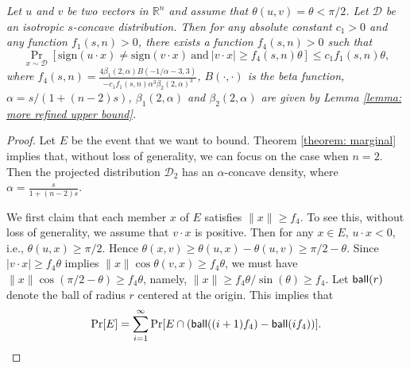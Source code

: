 \documentclass[11pt]{article}
\newcommand{\R}{\mathbb{R}}
\newcommand{\ball}{\textup{\textsf{ball}}}
\begin{document}
{{{{
\emph{Let $u$ and $v$ be two vectors in $\R^n$ and assume that $\theta(u,v)=\theta<\pi/2$. Let $\mathcal{D}$ be an isotropic $s$-concave distribution. Then for any absolute constant $c_1>0$ and any function $f_1(s,n)>0$, there exists a function $f_4(s,n)>0$ such that
\begin{equation*}
\Pr_{x\sim\mathcal{D}}[\mathrm{sign}(u\cdot x)\not=\mathrm{sign}(v\cdot x)\ \text{and}\ |v\cdot x|\ge f_4(s,n)\theta]\le c_1f_1(s,n)\theta,
\end{equation*}
where $f_4(s,n)=\frac{4\beta_1(2,\alpha)B(-1/\alpha-3,3)}{-c_1f_1(s,n)\alpha^3\beta_2(2,\alpha)^3}$, $B(\cdot,\cdot)$ is the beta function, $\alpha=s/(1+(n-2)s)$, $\beta_1(2,\alpha)$ and $\beta_2(2,\alpha)$ are given by Lemma \ref{lemma: more refined upper bound}.}

\medskip
\begin{proof}
Let $E$ be the event that we want to bound. Theorem \ref{theorem: marginal} implies that, without loss of generality, we can focus on the case when $n=2$. Then the projected distribution $\mathcal{D}_2$ has an $\alpha$-concave density, where $\alpha=\frac{s}{1+(n-2)s}$.

We first claim that each member $x$ of $E$ satisfies $\|x\|\ge f_4$. To see this, without loss of generality, we assume that $v\cdot x$ is positive. Then for any $x\in E$, $u\cdot x<0$, i.e., $\theta(u,x)\ge \pi/2$. Hence $\theta(x,v)\ge \theta(u,x)-\theta(u,v)\ge \pi/2-\theta$. Since $|v\cdot x|\ge f_4\theta$ implies $\|x\|\cos\theta(v,x)\ge f_4\theta$, we must have $\|x\|\cos(\pi/2-\theta)\ge f_4\theta$, namely, $\|x\|\ge f_4\theta/\sin(\theta)\ge f_4$. Let $\ball(r)$ denote the ball of radius $r$ centered at the origin. This implies that
\begin{equation*}
\Pr[E]=\sum_{i=1}^\infty \Pr[E\cap (\ball((i+1)f_4)-\ball(if_4))].
\end{equation*}


\end{proof}}}}}
\end{document}
